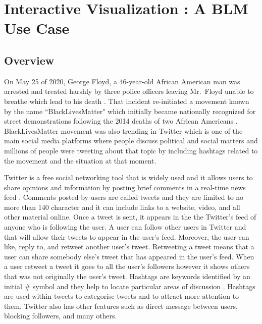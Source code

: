 \section{Interactive Visualization \cite{d3tool} : A BLM Use Case}


\subsection{Overview}

On May 25 of 2020, George Floyd, a 46-year-old African American man was arrested and treated harshly by three police officers leaving Mr.~Floyd unable to breathe which lead to his death \cite{dreyer2020death}. That incident re-initiated a movement known by the name ``BlackLivesMatter" which initially became nationally recognized for street demonstrations following the 2014 deaths of two African Americans \cite{garza2014herstory}. BlackLivesMatter movement was also trending in Twitter which is one of the main social media platforms where people discuss political and social matters and millions of people were tweeting about that topic by including hashtags related to the movement and the situation at that moment.


Twitter is a free social networking tool that is widely used and it allows users to share opinions and information by posting brief comments in a real-time news feed \cite{mistry2011critical, bristol2010twitter}. Comments posted by users are called tweets and they are limited to no more than 140 character and it can include links to a website, video, and all other material online. Once a tweet is sent, it appears in the the Twitter's feed of anyone who is following the user. A user can follow other users in Twitter and that will allow their tweets to appear in the user's feed. Moreover, the user can like, reply to, and retweet another user's tweet. Retweeting a tweet means that a user can share somebody else's tweet that has appeared in the user's feed. When a user retweet a tweet it goes to all the user's followers however it shows others that was not originally the user's tweet. Hashtags are keywords identified by an initial \# %
symbol and they help to locate particular areas of discussion \cite{bristol2010twitter}. Hashtags are used within tweets to categorise tweets and to attract more attention to them. Twitter also has other features such as direct message between users, blocking followers, and many others.





